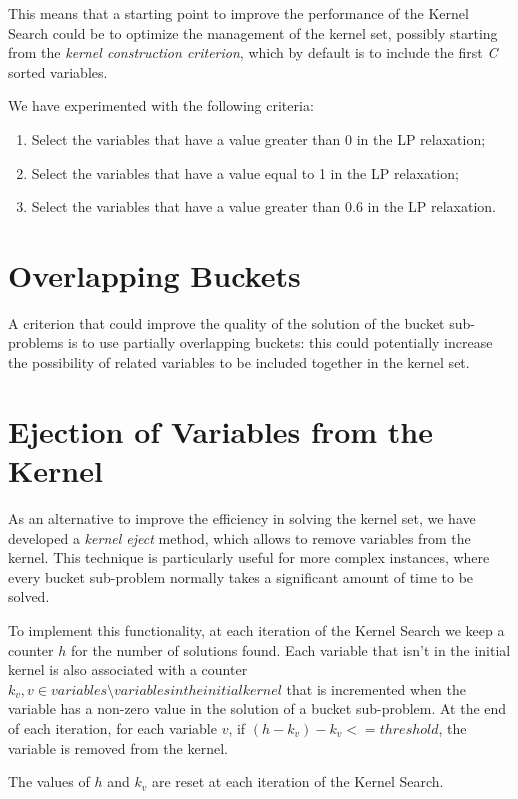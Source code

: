 This means that a starting point to improve the performance of the Kernel Search
could be to optimize the management of the kernel set,
possibly starting from the \textit{kernel construction criterion},
which by default is to include the first \textit{C} sorted variables.

We have experimented with the following criteria:
\begin{enumerate}
    \item Select the variables that have a value greater than 0 in the LP relaxation;
    \item Select the variables that have a value equal to 1 in the LP relaxation;
    \item Select the variables that have a value greater than 0.6
    in the LP relaxation.
\end{enumerate}


\section{Overlapping Buckets}
A criterion that could improve the quality of the solution of the bucket
sub-problems is to use partially overlapping buckets:
this could potentially increase the possibility of related
variables to be included together in the kernel set.


\section{Ejection of Variables from the Kernel}
As an alternative to improve the efficiency in solving the kernel set,
we have developed a \textit{kernel eject} method, which allows to remove variables from the kernel.
This technique is particularly useful for more complex instances, where every
bucket sub-problem normally takes a significant amount of time to be solved.

To implement this functionality, at each iteration of the Kernel Search
we keep a counter \(h\) for the number of solutions found.
Each variable that isn't in the initial kernel
is also associated with a counter \(k_{v}, v \in variables \setminus variables in the initial kernel\)
that is incremented when the variable has a non-zero value in the solution of a bucket sub-problem.
At the end of each iteration, for each variable \(v\), if
\((h - k_{v}) - k_{v} <= threshold\), the variable is removed from the kernel.

The values of \(h\) and \(k_{v}\) are reset at each iteration of the Kernel Search.

